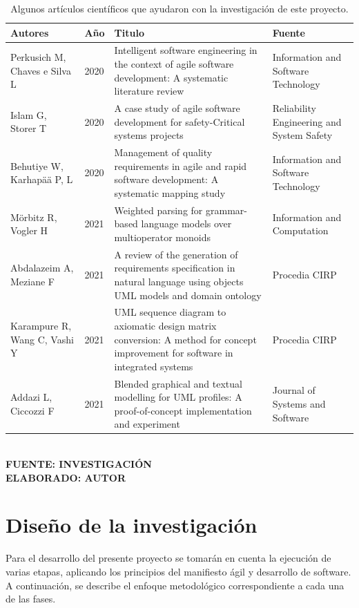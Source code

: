 \begin{table} [h!]
	\centering
	\caption{Algunos artículos científicos que ayudaron con la investigación de este proyecto.}
	\label{tab:papers}
	\begin{tabular}{p{2.5cm}p{1cm}p{6cm}p{3cm}}
		\hline
		\textbf{Autores} & \textbf{Año} & \textbf{Titulo} & \textbf{Fuente} \\ 
		\hline
		Perkusich M, Chaves e Silva L & 2020 & Intelligent software engineering in the context of agile software development: A systematic literature review & Information and Software Technology \\
		Islam G, Storer T & 2020 &A case study of agile software development for safety-Critical systems projects &  Reliability Engineering and System Safety \\
		Behutiye W, Karhapää P, L & 2020 & Management of quality requirements in agile and rapid software development: A systematic mapping study & Information and Software Technology \\
		Mörbitz R, Vogler H & 2021 & Weighted parsing for grammar-based language models over multioperator monoids & Information and Computation \\
		Abdalazeim A, Meziane F & 2021 & A review of the generation of requirements specification in natural language using objects UML models and domain ontology & Procedia CIRP \\
		Karampure R, Wang C, Vashi Y & 2021 & UML sequence diagram to axiomatic design matrix conversion: A method for concept improvement for software in integrated systems & Procedia CIRP\\
		Addazi L, Ciccozzi F & 2021 & Blended graphical and textual modelling for UML profiles: A proof-of-concept implementation and experiment & Journal of Systems and Software \\
		\hline
	\end{tabular}
\vspace{4mm}
{\footnotesize \textbf{\\ FUENTE: INVESTIGACIÓN \\ ELABORADO: AUTOR}}
\end{table}

\section{Diseño de la investigación}

Para el desarrollo del presente proyecto se tomarán en cuenta la ejecución de varias etapas, aplicando los principios del manifiesto ágil y desarrollo de software. A continuación, se describe el enfoque metodológico correspondiente a cada una de las fases. 

